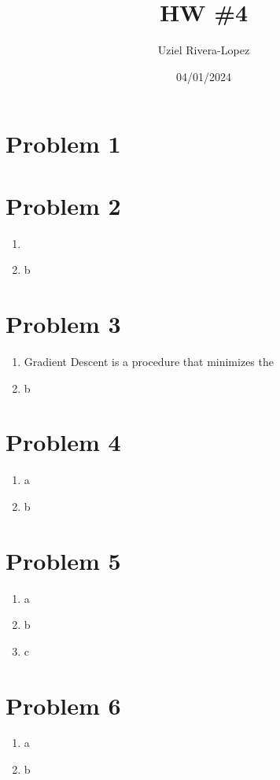 \documentclass{article}
\title{HW \#4}
\author{
    Uziel Rivera-Lopez
}
\date{04/01/2024}
\begin{document}
\maketitle

\section*{Problem 1}
\section*{Problem 2}
\begin{enumerate}[label=(\alph*)]
    \item 
    \item b
\end{enumerate}
\section*{Problem 3}
\begin{enumerate}[label=(\alph*)]
    \item Gradient Descent is a procedure that minimizes the 
    \item b
\end{enumerate}
\section*{Problem 4}
\begin{enumerate}[label=(\alph*)]
    \item a
    \item b
\end{enumerate}
\section*{Problem 5}
\begin{enumerate}[label=(\alph*)]
    \item a
    \item b
    \item c
\end{enumerate}
\section*{Problem 6}
\begin{enumerate}[label=(\alph*)]
    \item a
    \item b
\end{enumerate}
\end{document}
